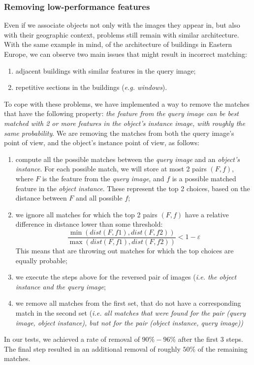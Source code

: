 \documentclass[a4paper,onecolumn,oneside,titlepage,11pt]{report}
\begin{document}
\subsubsection{Removing low-performance features}
Even if we associate objects not only with the images they appear in, but also with their geographic context, problems still remain with similar architecture. With the same example in mind, of the architecture of buildings in Eastern Europe, we can observe two main issues that might result in incorrect matching:
\begin{enumerate}
	\item adjacent buildings with similar features in the query image;
	\item repetitive sections in the buildings (\emph{e.g. windows}).
\end{enumerate}
To cope with these problems, we have implemented a way to remove the matches that have the following property: \emph{the feature from the query image can be best matched with 2 or more features in the object's instance image, with roughly the same probability}. We are removing the matches from both the query image's point of view, and the object's instance point of view, as follows:
\begin{enumerate}
	\item compute all the possible matches between the \emph{query image} and an \emph{object's instance}. For each possible match, we will store at most 2 pairs $(F, f)$, where $F$ is the feature from the \emph{query image}, and $f$ is a possible matched feature in the \emph{object instance}. These represent the top 2 choices, based on the distance between $F$ and all possible $f$;
	\item we ignore all matches for which the top 2 pairs $(F, f)$ have a relative difference in distance lower than some threshold:
	$$
	\frac{\min(dist(F, f1), dist(F, f2))}{\max(dist(F, f1), dist(F, f2))} < 1 - \varepsilon
	$$
	This means that are throwing out matches for which the top choices are equally probable;
	\item we execute the steps above for the reversed pair of images (\emph{i.e. the object instance and the query image};
	\item we remove all matches from the first set, that do not have a corresponding match in the second set (\emph{i.e. all matches that were found for the pair \emph{(query image, object instance)}, but not for the pair \emph{(object instance, query image)})}
\end{enumerate}
In our tests, we achieved a rate of removal of $90\% - 96\%$ after the first 3 steps. The final step resulted in an additional removal of roughly $50\%$ of the remaining matches.
\end{document}
